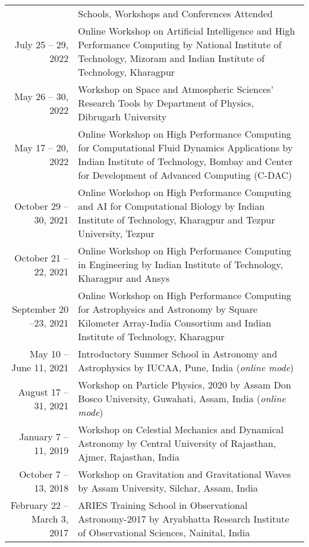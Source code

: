 \documentclass[a4paper, 11pt]{article}
\newcommand{\headingfont}{\Large\color{Bittersweet}}
\newenvironment{SectionTable}[1]{
	\renewcommand*{\arraystretch}{1.7}
	\setlength{\tabcolsep}{10pt}
	\begin{longtable}{Rp{5.2in}} & #1 \\}
{\end{longtable}\vspace{-.3cm}}
\begin{document}
\begin{SectionTable}{\headingfont Schools, Workshops and Conferences Attended}

July 25 -- 29, 2022 & 
Online Workshop on Artificial Intelligence and High Performance Computing by National Institute of Technology, Mizoram and Indian Institute of Technology, Kharagpur
\\
	 
May 26 -- 30, 2022 &
Workshop on Space and Atmospheric Sciences' Research Tools by Department of Physics, Dibrugarh University
\\

May 17 -- 20, 2022 & 
Online Workshop on High Performance Computing for Computational Fluid Dynamics Applications by Indian Institute of Technology, Bombay and Center for Development of Advanced Computing (C-DAC)
 \\

October 29 -- 30, 2021 & 
Online Workshop on High Performance Computing and AI for Computational Biology by Indian Institute of Technology, Kharagpur and Tezpur University, Tezpur
 \\
October 21 -- 22, 2021 & 
Online Workshop on High Performance Computing in Engineering by Indian Institute of Technology, Kharagpur and Ansys
 \\
 
September 20 --23, 2021 & 
Online Workshop on High Performance Computing for Astrophysics and Astronomy by Square Kilometer Array-India Consortium and Indian Institute of Technology, Kharagpur
 \\

May 10 -- June 11, 2021 &
Introductory Summer School in Astronomy and Astrophysics by IUCAA, Pune, India (\textit{online mode})
\\

August 17 --31, 2021 &
Workshop on Particle Physics, 2020 by Assam Don Bosco University, Guwahati, Assam, India (\textit{online mode})
\\

January 7 --11, 2019 &
Workshop on Celestial Mechanics and Dynamical Astronomy by Central University of Rajasthan, Ajmer, Rajasthan, India
\\

October 7 --13, 2018 &
Workshop on Gravitation and Gravitational Waves by Assam University, Silchar, Assam, India
\\

February 22 -- March 3, 2017 &
ARIES Training School in Observational Astronomy-2017 by Aryabhatta Research Institute of Observational Sciences, Nainital, India
\\


\end{SectionTable}
\end{document}
